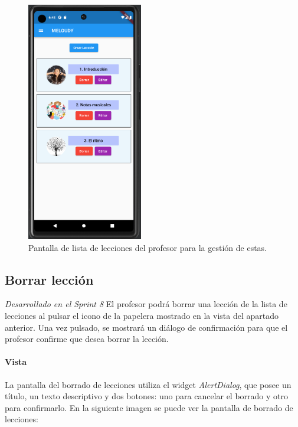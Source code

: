 \begin{figure}[H]
  \centering
  \includegraphics[width=0.45\textwidth]{imagenes/c7/listalecciones.png}
  \caption{Pantalla de lista de lecciones del profesor para la gestión de estas.} 
  \label{fig:login}
\end{figure}

\newpage

\subsection{Borrar lección} 

\textit{Desarrollado en el Sprint 8}
El profesor podrá borrar una lección de la lista de lecciones al pulsar el icono de la papelera mostrado en la vista del apartado anterior. Una vez pulsado, se mostrará un diálogo de confirmación para que el profesor confirme que desea borrar la lección.

\paragraph*{Vista}
La pantalla del borrado de lecciones utiliza el widget \textit{AlertDialog}, que posee
un título, un texto descriptivo y dos botones: uno para cancelar el borrado y otro para confirmarlo.
En la siguiente imagen se puede ver la pantalla de borrado de lecciones:


